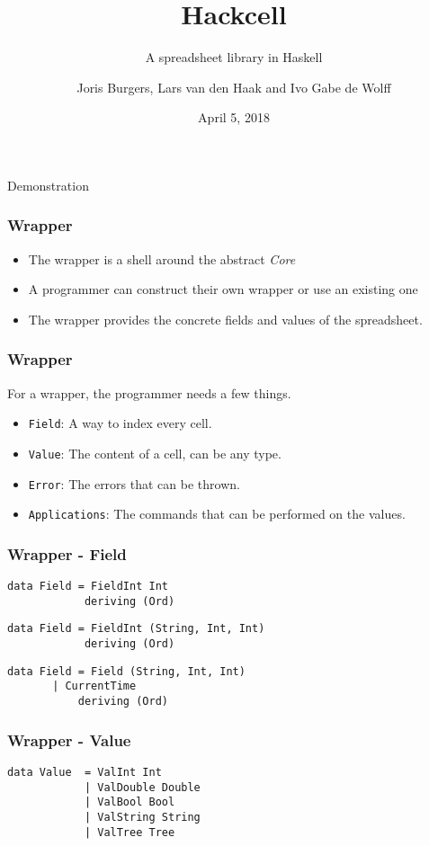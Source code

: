 \documentclass{beamer}
\title{Hackcell}
\subtitle{A spreadsheet library in Haskell}
\author{Joris Burgers, Lars van den Haak and Ivo Gabe de Wolff}
\date{April 5, 2018}
\begin{document}
	\frame{\titlepage}
  \begin{frame}
	\begin{center}
		\huge{Demonstration}
	\end{center}
  \end{frame}
  \begin{frame}
  		\frametitle{Wrapper}
		\begin{itemize}  		
  			\item The wrapper is a shell around the abstract \textit{Core}
  			\item A programmer can construct their own wrapper or use an existing one
  			\item The wrapper provides the concrete fields and values of the spreadsheet.
  		\end{itemize}
  \end{frame}
  \begin{frame}
  		\frametitle{Wrapper}
  		For a wrapper, the programmer needs a few things.
  		\begin{itemize}
  			\item \texttt{Field}: A way to index every cell.
  			\item \texttt{Value}: The content of a cell, can be any type.
  			\item \texttt{Error}: The errors that can be thrown.
  			\item \texttt{Applications}: The commands that can be performed on the values.
  		\end{itemize}
  \end{frame}
  \begin{frame}[fragile]
  		\frametitle{Wrapper - Field}
  		\begin{verbatim}
data Field = FieldInt Int
            deriving (Ord)
  		\end{verbatim}
  		\pause
		\begin{verbatim}
data Field = FieldInt (String, Int, Int)
            deriving (Ord)
  		\end{verbatim}  		
  		\pause
  		\begin{verbatim}
data Field = Field (String, Int, Int)
	   | CurrentTime
           deriving (Ord)
        \end{verbatim} 
  \end{frame}
\begin{frame}[fragile]
  		\frametitle{Wrapper - Value}
  		\begin{verbatim}
data Value  = ValInt Int
            | ValDouble Double
            | ValBool Bool
            | ValString String
            | ValTree Tree
  		\end{verbatim}
  \end{frame}
\end{document}
